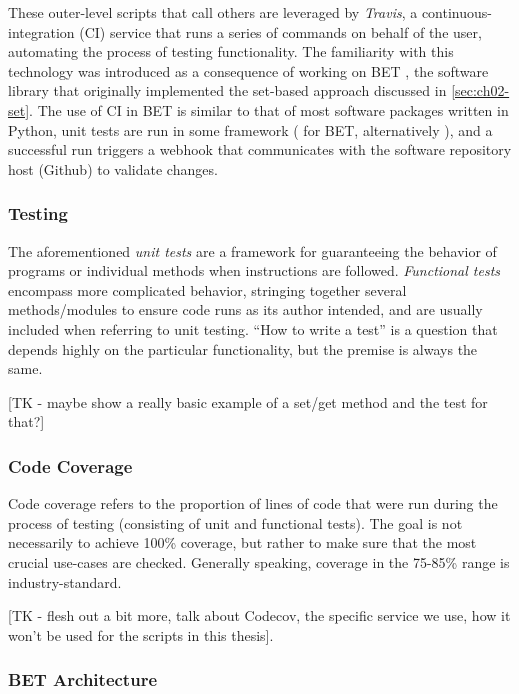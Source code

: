 These outer-level scripts that call others are leveraged by \emph{Travis}, a continuous-integration (CI) service that runs a series of commands on behalf of the user, automating the process of testing functionality.
The familiarity with this technology was introduced as a consequence of working on BET \cite{pyBET}, the software library that originally implemented the set-based approach discussed in \ref{sec:ch02-set}.
The use of CI in BET is similar to that of most software packages written in Python, unit tests are run in some framework ( for BET, alternatively ), and a successful run triggers a webhook that communicates with the software repository host (Github) to validate changes.

\subsubsection{Testing}\label{sec:unit-testing}
The aforementioned \emph{unit tests} are a framework for guaranteeing the behavior of programs or individual methods when instructions are followed.
\emph{Functional tests} encompass more complicated behavior, stringing together several methods/modules to ensure code runs as its author intended, and are usually included when referring to unit testing.
``How to write a test'' is a question that depends highly on the particular functionality, but the premise is always the same.

[TK - maybe show a really basic example of a set/get method and the test for that?]


\subsubsection{Code Coverage}\label{sec:code-coverage}

Code coverage refers to the proportion of lines of code that were run during the process of testing (consisting of unit and functional tests).
The goal is not necessarily to achieve 100\% coverage, but rather to make sure that the most crucial use-cases are checked.
Generally speaking, coverage in the 75-85\% range is industry-standard.

[TK - flesh out a bit more, talk about Codecov, the specific service we use, how it won't be used for the scripts in this thesis].


\subsubsection{BET Architecture}\label{sec:bet-architecture-overview}

